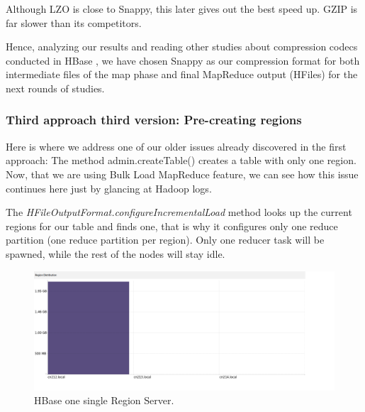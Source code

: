 Although LZO is close to Snappy, this later gives out the best speed up. GZIP is far slower than its competitors.

Hence, analyzing our results and reading other studies about compression codecs conducted in HBase \cite{CompressionComparison}, we have chosen Snappy as our compression format for both intermediate files of the map phase and final MapReduce output (HFiles) for the next rounds of studies.




\subsubsection{Third approach third version: Pre-creating regions}
Here is where we address one of our older issues already discovered in the first approach: The method admin.createTable() creates a table with only one region. Now, that we are using Bulk Load MapReduce feature, we can see how this issue continues here just by glancing at Hadoop logs.




The \textit{HFileOutputFormat.configureIncrementalLoad} method looks up the current regions for our table and finds one, that is why it configures  only one reduce partition (one reduce partition per region). Only one reducer task will be spawned, while the rest of the nodes will stay idle.




\begin{figure}[htb]
\centering
\includegraphics[width=1\textwidth,height=0.34\textheight]{./images/1regionserveractive1.png}
\caption{HBase one single Region Server.} \label{fig:oneRegion}
\end{figure}



